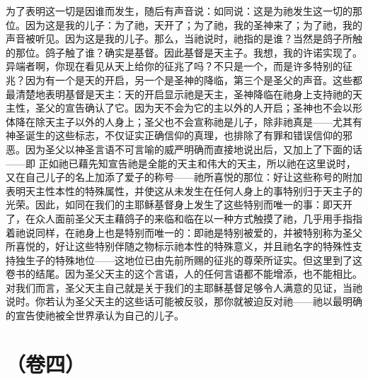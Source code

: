 为了表明这一切是因谁而发生，随后有声音说：如同说：这是为祂发生这一切的那位。因为这是我的儿子：为了祂，天开了；为了祂，我的圣神来了；为了祂，我的声音被听见。因为这是我的儿子。那么，当祂说时，祂指的是谁？当然是鸽子所触的那位。鸽子触了谁？确实是基督。因此基督是天主子。我想，我的许诺实现了。异端者啊，你现在看见从天上给你的征兆了吗？不只是一个，而是许多特别的征兆？因为有一个是天的开启，另一个是圣神的降临，第三个是圣父的声音。这些都最清楚地表明基督是天主：天的开启显示祂是天主，圣神降临在祂身上支持祂的天主性，圣父的宣告确认了它。因为天不会为它的主以外的人开启；圣神也不会以形体降在除天主子以外的人身上；圣父也不会宣称祂是儿子，除非祂真是——尤其有神圣诞生的这些标志，不仅证实正确信仰的真理，也排除了有罪和错误信仰的邪恶。因为圣父以神圣言语不可言喻的威严明确而直接地说出后，又加上了下面的话——即 正如祂已藉先知宣告祂是全能的天主和伟大的天主，所以祂在这里说时，又在自己儿子的名上加添了爱子的称号——祂所喜悦的那位：好让这些称号的附加表明天主性本性的特殊属性，并使这从未发生在任何人身上的事特别归于天主子的光荣。因此，如同在我们的主耶稣基督身上发生了这些特别而唯一的事：即天开了，在众人面前圣父天主藉鸽子的来临和临在以一种方式触摸了祂，几乎用手指指着祂说同样，在祂身上也是特别而唯一的：即祂是特别被爱的，并被特别称为圣父所喜悦的，好让这些特别伴随之物标示祂本性的特殊意义，并且祂名字的特殊性支持独生子的特殊地位——这地位已由先前所赐的征兆的尊荣所证实。但这里到了这卷书的结尾。因为圣父天主的这个言语，人的任何言语都不能增添，也不能相比。对我们而言，圣父天主自己就是关于我们的主耶稣基督足够令人满意的见证，当祂说时。你若认为圣父天主的这些话可能被反驳，那你就被迫反对祂——祂以最明确的宣告使祂被全世界承认为自己的儿子。\par



\section{（卷四）}


